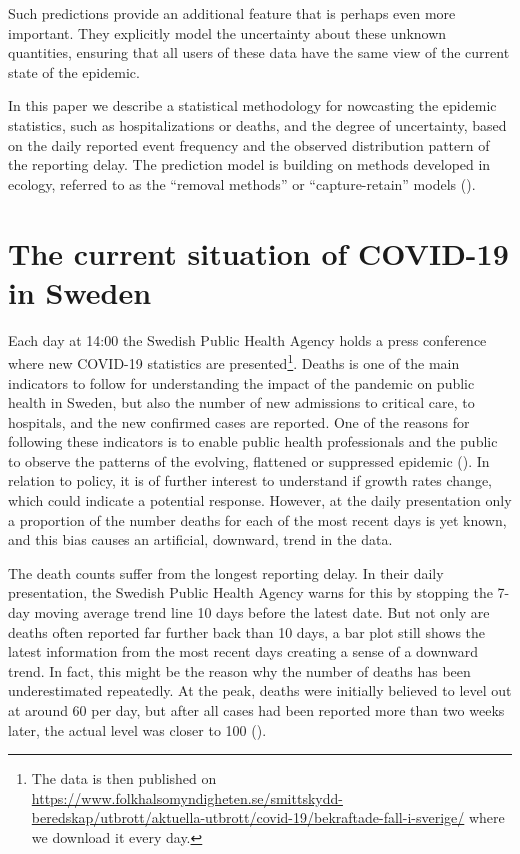 \documentclass[a4paper,11pt,article,oneside,openany,american]{memoir}
\begin{document}
Such predictions provide an additional feature that is perhaps even more important. They explicitly model the uncertainty about these unknown quantities, ensuring that all users of these data have the same view of the current state of the epidemic.

In this paper we describe a statistical methodology for nowcasting the epidemic statistics, such as hospitalizations or deaths, and the degree of uncertainty, based on the daily reported event frequency and the observed distribution pattern of the reporting delay. The prediction model is building on methods developed in ecology, referred to as the ``removal methods'' or ``capture-retain'' models (\cite{Pollock1991_review_papers}).

\section{The current situation of COVID-19 in Sweden}
Each day at 14:00 the Swedish Public Health Agency holds a press conference where new COVID-19 statistics are presented\footnote{The data is then published on \url{https://www.folkhalsomyndigheten.se/smittskydd-beredskap/utbrott/aktuella-utbrott/covid-19/bekraftade-fall-i-sverige/} where we download it every day.}. Deaths is one of the main indicators to follow for understanding the impact of the pandemic on public health in Sweden, but also the number of new admissions to critical care, to hospitals, and the new confirmed cases are reported. One of the reasons for following these indicators is to enable public health professionals and the public to observe the patterns of the evolving, flattened or suppressed epidemic (\cite{Anderson2020_how_will}). In relation to policy, it is of further interest to understand if growth rates change, which could indicate a potential response. However, at the daily presentation only a proportion of the number deaths for each of the most recent days is yet known, and this bias causes an artificial, downward, trend in the data.

The death counts suffer from the longest reporting delay. In their daily presentation, the Swedish Public Health Agency warns for this by stopping the 7-day moving average trend line 10 days before the latest date. But not only are deaths often reported far further back than 10 days, a bar plot still shows the latest information from the most recent days creating a sense of a downward trend. In fact, this might be the reason why the number of deaths has been underestimated repeatedly. At the peak, deaths were initially believed to level out at around 60 per day, but after all cases had been reported more than two weeks later, the actual level was closer to 100 (\cite{Ohman2020_antalet_virusdoda}).
\end{document}
